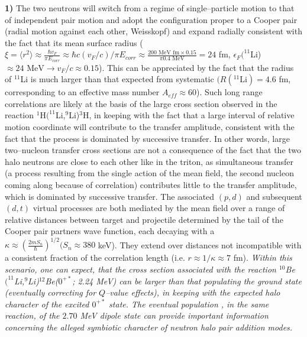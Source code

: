 \begin{subappendices}
    
\textbf{1)} The two neutrons will switch from a regime of single--particle motion to that of independent pair motion and adopt the configuration proper to a Cooper pair (radial motion against each other, Weisskopf) and expand radially consistent with the fact that its mean surface radius ($\xi=\langle r^2\rangle\approx\frac{\hbar v_F}{\pi E_{corr}}\approx \hbar c(v_F/c)/\pi E_{corr}\approx\frac{200\text{ MeV fm}\times 0.15}{\pi 0.4\text{ MeV}}=24$ fm, $\epsilon_F(^{11}$Li)$\approx 24\text{ MeV}\rightarrow v_F/c\approx 0.15$). This can be appreciated by the fact that the radius of $^{11}$Li is much larger than that expected from systematic $(R(^{11}\text{Li})=4.6 $ fm, corresponding to an effective mass number $A_{eff}\approx60$).
    	Such long range correlations are likely at the basis of the large cross section observed in the reaction $^1$H$(^{11}$Li,$^9$Li)$^3$H, in keeping with the fact that a large interval of relative motion coordinate will contribute to the transfer amplitude, consistent with the fact that the process is dominated by successive transfer. In other words, large two--nucleon transfer cross sections are not a consequence of the fact that the two halo neutrons are close to each other like in the triton, as simultaneous transfer (a process resulting from the single action of the mean field, the second nucleon coming along because of correlation) contributes little to the transfer amplitude, which is dominated by successive transfer. The associated $(p,d)$ and subsequent $(d,t)$ virtual processes are both mediated by the mean field over a range of relative distances between target and projectile determined by the tail of the Cooper pair partners wave function, each decaying with a $\kappa\approx\left(\frac{2mS_n}{\hbar}\right)^{1/2} (S_n\approx 380 $ keV). They extend over distances not incompatible with a consistent fraction of the correlation length (i.e. $r\approx1/\kappa\approx 7$ fm).
    	\textit{Within this scenario, one can expect, that the cross section associated with the reaction $^{10}$Be$(^{11}$Li,$^9$Li)$^{12}$Be($0^{+*}$; 2.24 MeV) can be larger than that populating the ground state (eventually correcting for $Q$--value effects), in keeping with the expected halo character of the excited $0^{+*}$ state. The eventual population , in the same reaction, of the $2.70$ MeV dipole state can provide important information concerning the alleged symbiotic character of neutron halo pair addition modes.}
    	

\end{subappendices}
